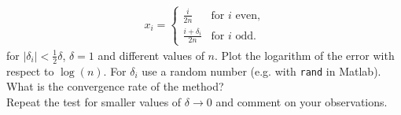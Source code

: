 \documentclass[11pt,a4paper,german]{scrartcl}
\theoremstyle{break}   %
\begin{document}
\begin{enumerate}
\begin{align*}
x_i = 
\begin{cases}
\frac{i}{2n} & \text{for } i \text{ even,}\\
\frac{i+\delta_i}{2n} & \text{for } i \text{ odd}.
\end{cases}
\end{align*}
for \(|\delta_i| < \frac{1}{2}\delta\), \(\delta=1\) and different values of \(n\). Plot the logarithm of the error with respect to \(\log(n)\). For \(\delta_i\) use a random number (e.g. with \texttt{rand} in Matlab). What is the convergence rate of the method?\\
Repeat the test for smaller values of \(\delta \rightarrow 0\) and comment on your observations.
\end{enumerate}
\end{document}
